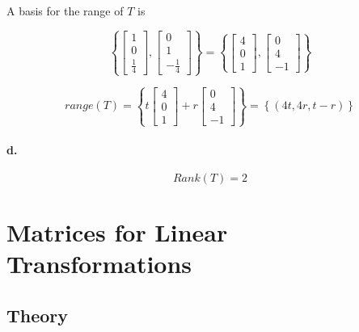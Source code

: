 \documentclass{report}
\begin{document}
\noindent A basis for the range of $T$ is 

$$
\left\{ \begin{bmatrix} 1 \\ 0 \\ \frac{1}{4} \end{bmatrix}, \begin{bmatrix} 0 \\1 \\ -\frac{1}{4} \end{bmatrix} \right\} = \left\{ \begin{bmatrix} 4 \\ 0 \\ 1 \end{bmatrix}, \begin{bmatrix} 0 \\ 4 \\ -1 \end{bmatrix} \right\}
$$

$$
range(T) = \left\{ t\begin{bmatrix} 4 \\ 0 \\ 1 \end{bmatrix} + r \begin{bmatrix} 0 \\ 4 \\ -1 \end{bmatrix}\right\} = \left\{ (4t,4r,t-r)\right\}
$$

\paragraph{d.}

$$
Rank(T)= 2
$$

\section{Matrices for Linear Transformations}

\subsection{Theory}
\end{document}
